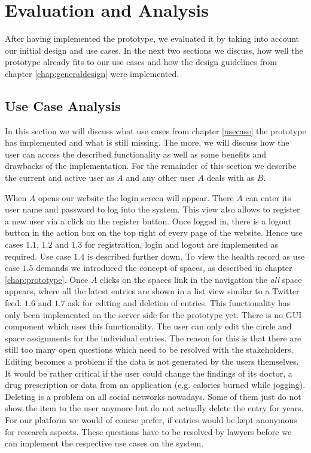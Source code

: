 \chapter{Evaluation and Analysis}
\label{chap:evaluation}

After having implemented the prototype, we evaluated it by taking into account our initial design and use cases. In the next two sections we discuss, how well the prototype already fits to our use cases and how the design guidelines from chapter \ref{chap:generaldesign} were implemented. 


\section{Use Case Analysis}

In this section we will discuss what use cases from chapter \ref{usecase} the prototype has implemented and what is still missing. The more, we will discuss how the user can access the described functionality as well as some benefits and drawbacks of the implementation. For the remainder of this section we describe the current and active user as $A$ and any other user $A$ deals with as $B$.

When $A$ opens our website the login screen will appear. There $A$ can enter its user name and password to log into the system. This view also allows to register a new user via a click on the register button. Once logged in, there is a logout button in the action box on the top right of every page of the website. Hence use cases $1.1$, $1.2$ and $1.3$ for registration, login and logout are implemented as required. 
\newline
Use case $1.4$ is described further down. To view the health record as use case $1.5$ demands we introduced the concept of spaces, as described in chapter \ref{chap:prototype}. Once $A$ clicks on the spaces link in the navigation the \emph{all} space appears, where all the latest entries are shown in a list view similar to a Twitter feed. \newline
$1.6$ and $1.7$ ask for editing and deletion of entries. This functionality has only been implemented on the server side for the prototype yet. There is no GUI component which uses this functionality. The user can only edit the circle and space assignments for the individual entries. The reason for this is that there are still too many open questions which need to be resolved with the stakeholders. Editing becomes a problem if the data is not generated by the users themselves. It would be rather critical if the user could change the findings of its doctor, a drug prescription or data from an application (e.g. calories burned while jogging). Deleting is a problem on all social networks nowadays. Some of them just do not show the item to the user anymore but do not actually delete the entry for years. For our platform we would of course prefer, if entries would be kept anonymous for research aspects. These questions have to be resolved by lawyers before we can implement the respective use cases on the system.

